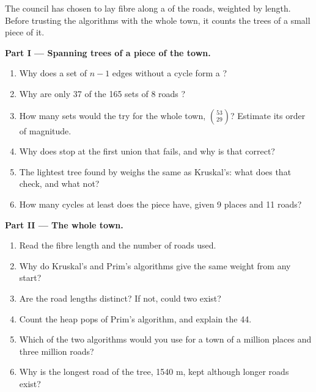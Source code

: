 \begin{problem}\label{pb:b1:spanning-trees:1}
The council has chosen to lay fibre along a  of the roads, weighted by length. Before trusting the
algorithms with the whole town, it counts the trees of a small piece of it.
\label{lst:b1:spanning-trees:count}
\label{out:b1:spanning-trees:count}
\label{out:b1:spanning-trees:bottleneck}

\medskip\noindent\textbf{Part I --- Spanning trees of a piece of the town.}
\begin{enumerate}
\item Why does a set of $n - 1$ edges without a cycle form a ?
\item Why are only 37 of the 165 sets of 8 roads ?
\item How many sets would the  try for the whole town, $\binom{53}{29}$? Estimate its order of magnitude.
\item Why does  stop at the first union that fails, and why is that correct?
\item The lightest tree found by  weighs the same as Kruskal's: what does that check, and what not?
\item How many cycles at least does the piece have, given 9 places and 11 roads?
\end{enumerate}

\medskip\noindent\textbf{Part II --- The whole town.}
\begin{enumerate}[resume]
\item Read the fibre length and the number of roads used.
\item Why do Kruskal's and Prim's algorithms give the same weight from any start?
\item Are the road lengths distinct? If not, could two  exist?
\item Count the heap pops of Prim's algorithm, and explain the 44.
\item Which of the two algorithms would you use for a town of a million places and three million roads?
\item Why is the longest road of the tree, 1540 m, kept although longer roads exist?
\end{enumerate}


\end{problem}
